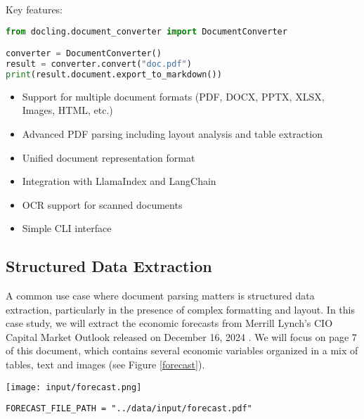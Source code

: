 Key features:
\begin{marginlisting}[-1.35cm]
	\caption{Docling Sample Usage.}
    \label{lst:docling}
	\vspace{0.6cm}
	\begin{lstlisting}[language=Python,style=kaolstplain]
from docling.document_converter import DocumentConverter

converter = DocumentConverter()
result = converter.convert("doc.pdf")
print(result.document.export_to_markdown())
	\end{lstlisting}
\end{marginlisting}
\begin{itemize}
    \item Support for multiple document formats (PDF, DOCX, PPTX, XLSX, Images, HTML, etc.)
    \item Advanced PDF parsing including layout analysis and table extraction 
    \item Unified document representation format
    \item Integration with LlamaIndex and LangChain
    \item OCR support for scanned documents
    \item Simple CLI interface
\end{itemize}

\subsection{Structured Data Extraction}

A common use case where document parsing matters is structured data extraction, particularly in the presence of complex formatting and layout. In this case study, we will extract the economic forecasts from Merrill Lynch's CIO Capital Market Outlook released on December 16, 2024 . We will focus on page 7 of this document, which contains several economic variables organized in a mix of tables, text and images (see Figure \ref{forecast}).

\begin{figure*}[h!]
\centering
\texttt{[image: input/forecast.png]}
\caption{Merrill Lynch's CIO Capital Market Outlook released on December 16, 2024 \cite{merrill2024}}
\label{forecast}
\end{figure*}

\begin{verbatim}
FORECAST_FILE_PATH = "../data/input/forecast.pdf"
\end{verbatim}

